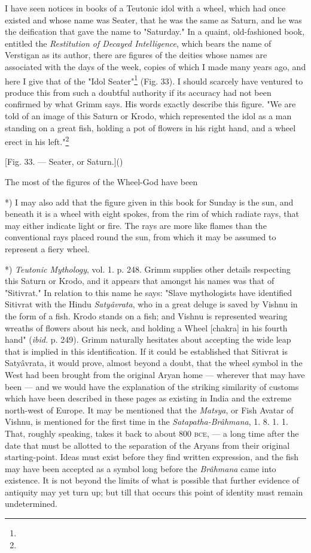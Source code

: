 \documentclass[a4paper, 11pt, oneside, polutonikogreek, english]{article}
\begin{document}
I have seen notices in books of a Teutonic idol with a wheel, which had once existed and whose name was Seater, that he was the same as Saturn, and he was the deification that gave the name to "Saturday." In a quaint, old-fashioned book, entitled the \emph{Restitution of Decayed Intelligence}, which bears the name of Verstigan as its author, there are figures of the deities whose names are associated with the days of the week, copies of which I made many years ago, and here I give that of the "Idol Seater"\footnote{} (Fig. 33). I should scarcely have ventured to produce this from such a doubtful authority if its accuracy had not been confirmed by what Grimm says. His words exactly describe this figure. "We are told of an image of this Saturn or Krodo, which represented the idol as a man standing on a great fish, holding a pot of flowers in his right hand, and a wheel erect in his left."\footnote{}

[Fig. 33. --- Seater, or Saturn.]()

The most of the figures of the Wheel-God have been 

*) I may also add that the figure given in this book for Sunday is the sun, and beneath it is a wheel with eight spokes, from the rim of which radiate rays, that may either indicate light or fire. The rays are more like flames than the conventional rays placed round the sun, from which it may be assumed to represent a fiery wheel.

*) \emph{Teutonic Mythology}, vol. 1. p. 248. Grimm supplies other details respecting this Saturn or Krodo, and it appears that amongst his names was that of "Sitivrat." In relation to this name he says: "Slave mythologists have identified Sitivrat with the Hindu \emph{Satyâvrata}, who in a great deluge is saved by Vishnu in the form of a fish. Krodo stands on a fish; and Vishnu is represented wearing wreaths of flowers about his neck, and holding a Wheel [chakra] in his fourth hand" (\emph{ibid.} p. 249). Grimm naturally hesitates about accepting the wide leap that is implied in this identification. If it could be established that Sitivrat is Satyâvrata, it would prove, almost beyond a doubt, that the wheel symbol in the West had been brought from the original Aryan home --- wherever that may have been --- and we would have the explanation of the striking similarity of customs which have been described in these pages as existing in India and the extreme north-west of Europe. It may be mentioned that the \emph{Matsya}, or Fish Avatar of Vishnu, is mentioned for the first time in the \emph{Satapatha-Brâhmana}, 1. 8. 1. 1. That, roughly speaking, takes it back to about 800 \textsc{bce}, --- a long time after the date that must be allotted to the separation of the Aryans from their original starting-point. Ideas must exist before they find written expression, and the fish may have been accepted as a symbol long before the \emph{Brâhmana} came into existence. It is not beyond the limits of what is possible that further evidence of antiquity may yet turn up; but till that occurs this point of identity must remain undetermined.
\end{document}
